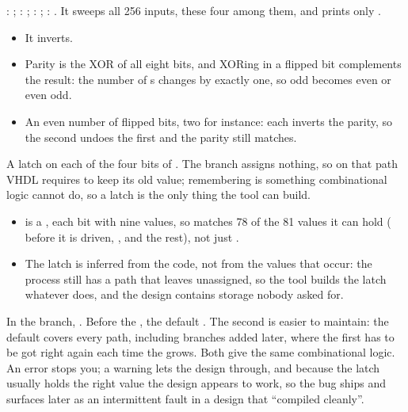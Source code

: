 : ; : ; : ;
: .
It sweeps all 256 inputs, these four among them, and prints only
.
\begin{itemize}
  \item It inverts.
  \item Parity is the XOR of all eight bits, and XORing in a flipped bit complements the result:
    the number of s changes by exactly one, so odd becomes even or even odd.
  \item An even number of flipped bits, two for instance: each inverts the parity, so the second
    undoes the first and the parity still matches.
\end{itemize}

A latch on each of the four bits of . The  branch assigns
nothing, so on that path VHDL requires  to keep its old value; remembering is something
combinational logic cannot do, so a latch is the only thing the tool can build.
\begin{itemize}
  \item {} is a , each bit with nine values, so 
    matches 78 of the 81 values it can hold ( before it is driven, , 
    and the rest), not just .
  \item The latch is inferred from the code, not from the values that occur: the process still has
    a path that leaves  unassigned, so the tool builds the latch whatever 
    does, and the design contains storage nobody asked for.
\end{itemize}
In the branch, . Before the , the default
. The second is easier to maintain: the default covers every path, including
branches added later, where the first has to be got right again each time the  grows.
Both give the same combinational logic.
An error stops you; a warning lets the design through, and because the latch usually holds the
right value the design appears to work, so the bug ships and surfaces later as an intermittent
fault in a design that ``compiled cleanly''.

